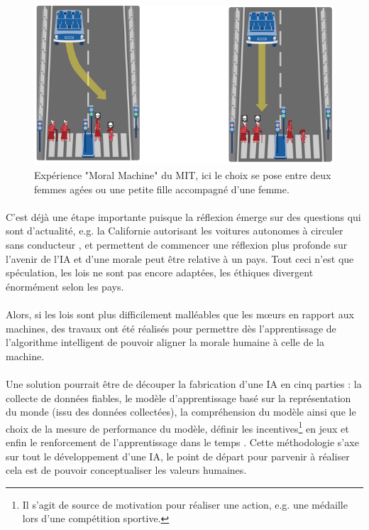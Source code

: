 \documentclass[10pt, french, a4paper]{article}
\begin{document}
\begin{figure}[hbt!]
    \centering
    \includegraphics[width=\textwidth]{images/moral_machine.png}
    \caption{Expérience "Moral Machine" du MIT, ici le choix se pose entre deux femmes agées ou une petite fille accompagné d'une femme.}
    \label{fig:moral_machine}
\end{figure}

\paragraph{}
C’est déjà une étape importante puisque la réflexion émerge sur des questions qui sont d’actualité, e.g. la Californie autorisant les voitures autonomes à circuler sans conducteur \citep{shepardson_waymo_2018}, et permettent de commencer une réflexion plus profonde sur l’avenir de l’IA et d’une morale peut être relative à un pays. Tout ceci n’est que spéculation, les lois ne sont pas encore adaptées, les éthiques divergent énormément selon les pays.

\paragraph{}
Alors, si les lois sont plus difficilement malléables que les mœurs en rapport aux machines, des travaux ont été réalisés pour permettre dès l’apprentissage de l’algorithme intelligent de pouvoir aligner la morale humaine à celle de la machine.

\paragraph{}
Une solution pourrait être de découper la fabrication d’une IA en cinq parties : la collecte de données fiables, le modèle d’apprentissage basé sur la représentation du monde (issu des données collectées), la compréhension du modèle ainsi que le choix de la mesure de performance du modèle, définir les incentives\footnote{Il s’agit de source de motivation pour réaliser une action, e.g. une médaille lors d’une compétition sportive.} en jeux et enfin le renforcement de l’apprentissage dans le temps \citep{hoang_roadmap_2018}. Cette méthodologie s’axe sur tout le développement d’une IA, le point de départ pour parvenir à réaliser cela est de pouvoir conceptualiser les valeurs humaines.
\end{document}
